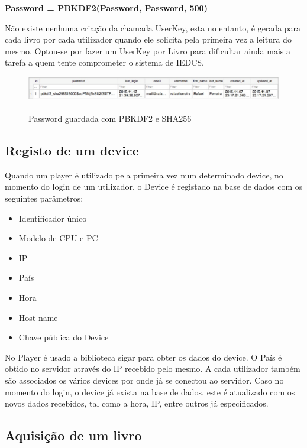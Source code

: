 \documentclass[pdftex,12pt,a4paper]{report}
\begin{document}
\begin{center}
	\textbf{Password = PBKDF2(Password, Password, 500)}
\end{center}

Não existe nenhuma criação da chamada UserKey, esta no entanto, é gerada para cada livro por cada utilizador quando ele solicita pela primeira vez a leitura do mesmo. Optou-se por fazer um UserKey por Livro para dificultar ainda mais a tarefa a quem tente comprometer o sistema de IEDCS.

\begin{figure}[!htb]
\center
 \includegraphics[width=150mm,scale=1]{pbkdf2_saved.pdf}
 \caption{\\Password guardada com PBKDF2 e SHA256}
 \label{fig:eer}
\end{figure}

\subsection{Registo de um device}
Quando um player é utilizado pela primeira vez num determinado device, no momento do login de um utilizador, o Device é registado na base de dados com os seguintes parâmetros:

\begin{itemize}
\item Identificador único
\item Modelo de CPU e PC
\item IP
\item País
\item Hora
\item Host name
\item Chave pública do Device
\end{itemize}

	No Player é usado a biblioteca sigar para obter os dados do device. O País é obtido no servidor através do IP recebido pelo mesmo.
	A cada utilizador também são associados os vários devices por onde já se conectou ao servidor.
	Caso no momento do login, o device já exista na base de dados, este é atualizado com os novos dados recebidos, tal como a hora, IP, entre outros já especificados.

\subsection{Aquisição de um livro}
\end{document}
